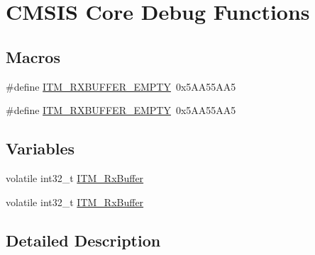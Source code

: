 \hypertarget{group___c_m_s_i_s__core___debug_functions}{\section{C\-M\-S\-I\-S Core Debug Functions}
\label{group___c_m_s_i_s__core___debug_functions}
}
\subsection*{Macros}
\begin{DoxyCompactItemize}
\item 
\#define \hyperlink{group___c_m_s_i_s__core___debug_functions_gaa822cb398ee022b59e9e6c5d7bbb228a}{I\-T\-M\-\_\-\-R\-X\-B\-U\-F\-F\-E\-R\-\_\-\-E\-M\-P\-T\-Y}~0x5\-A\-A55\-A\-A5
\item 
\#define \hyperlink{group___c_m_s_i_s__core___debug_functions_gaa822cb398ee022b59e9e6c5d7bbb228a}{I\-T\-M\-\_\-\-R\-X\-B\-U\-F\-F\-E\-R\-\_\-\-E\-M\-P\-T\-Y}~0x5\-A\-A55\-A\-A5
\end{DoxyCompactItemize}
\subsection*{Variables}
\begin{DoxyCompactItemize}
\item 
volatile int32\-\_\-t \hyperlink{group___c_m_s_i_s__core___debug_functions_ga12e68e55a7badc271b948d6c7230b2a8}{I\-T\-M\-\_\-\-Rx\-Buffer}
\item 
volatile int32\-\_\-t \hyperlink{group___c_m_s_i_s__core___debug_functions_ga12e68e55a7badc271b948d6c7230b2a8}{I\-T\-M\-\_\-\-Rx\-Buffer}
\end{DoxyCompactItemize}


\subsection{Detailed Description}


